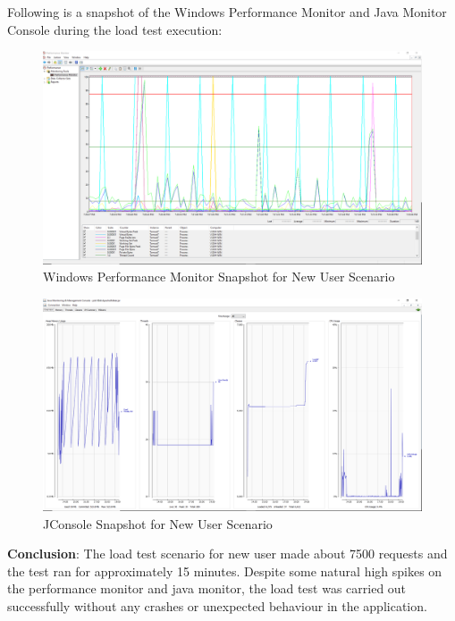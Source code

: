 \documentclass[fontsize=12pt,paper=letter,twoside]{scrartcl}
\begin{document}
\clearpage
\bigskip
\noindent Following is a snapshot of the Windows Performance Monitor and Java Monitor Console during the load test execution:

\begin{figure}[!htb]
\begin{center}
\includegraphics[width=.7\textwidth]{../../load-test/test-plans/new-user/perfmon-nu.png}
\end{center}
\caption{Windows Performance Monitor Snapshot for New User Scenario}
\label{fig:nuser:perfmon}
\end{figure}

\begin{figure}[!htb]
\begin{center}
\includegraphics[width=.7\textwidth]{../../load-test/test-plans/new-user/jconsole-nu.png}
\end{center}
\caption{JConsole Snapshot for New User Scenario}
\label{fig:nuser:jconsole}
\end{figure}

\smallskip
\noindent \textbf{Conclusion}: The load test scenario for new user made about 7500 requests and the test ran for approximately 15 minutes. Despite some natural high spikes on the performance monitor and java monitor, the load test was carried out successfully without any crashes or unexpected behaviour in the application.
\end{document}
